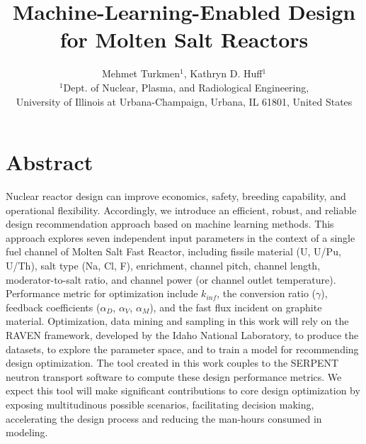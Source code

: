 \documentclass[10pt,a4paper]{article}
\begin{document}
\title{Machine-Learning-Enabled Design for Molten Salt Reactors}
\author{Mehmet Turkmen$^1$, Kathryn D. Huff$^1$\\
$^1$Dept. of Nuclear, Plasma, and Radiological Engineering, \\University of Illinois at Urbana-Champaign, Urbana, IL 61801, United States}

\maketitle


\section*{Abstract}
Nuclear reactor design can improve economics, safety, breeding capability, and 
operational flexibility. 
Accordingly, we introduce an efficient, robust, and reliable design recommendation 
approach based on machine learning methods.
This approach explores seven independent input parameters
in the context of a  single fuel channel of Molten Salt Fast Reactor, including 
fissile material (U, U/Pu, U/Th), salt type (Na, Cl, F), enrichment, channel 
pitch, channel length,
moderator-to-salt ratio, and channel power (or channel outlet temperature). 
Performance metric for optimization include 
$k_{inf}$, the conversion ratio ($\gamma$), feedback coefficients ($\alpha_D$, 
$\alpha_{V}$, $\alpha_{M}$), and the fast flux incident on graphite material.
Optimization, data mining and sampling in this work will rely on the RAVEN 
framework, developed by the Idaho National Laboratory, to produce the datasets, 
to explore the parameter space, and to train a model for recommending design 
optimization. The tool created in this work couples to the SERPENT neutron transport software
to compute these design performance metrics. We expect this tool will make
significant contributions to core design optimization by exposing multitudinous 
possible scenarios, facilitating decision making, accelerating the design 
process and reducing the man-hours consumed in modeling.
\end{document}
